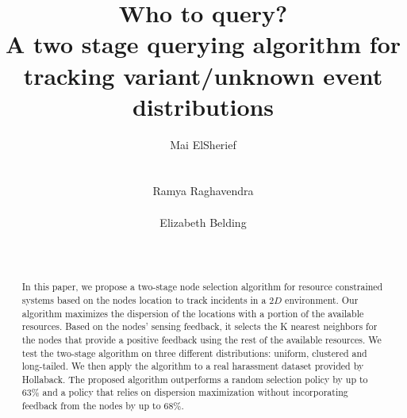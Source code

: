 \documentclass{acm_proc_article-sp}
\begin{document}
\title{Who to query? \\A two stage querying algorithm for tracking variant/unknown event distributions }
\author{
%
%
\alignauthor
Mai ElSherief\\
   \\
   \\
   \alignauthor
Ramya Raghavendra\\
   \\
\alignauthor
Elizabeth Belding\\
  \\
   \\
}
\maketitle
\begin{abstract}
In this paper, we propose a two-stage node selection algorithm for resource constrained systems based on the nodes location to track incidents in a $2D$ environment. Our algorithm maximizes the dispersion of the locations with a portion of the available resources. Based on the nodes' sensing feedback, it selects the K nearest neighbors for the nodes that provide a positive feedback using the rest of the available resources. We test the two-stage algorithm on three different distributions: uniform, clustered and long-tailed. We then apply the algorithm to a real harassment dataset provided by Hollaback. The proposed algorithm outperforms a random selection policy by up to $63\%$ and a policy that relies on dispersion maximization without incorporating feedback from the nodes by up to $68\%$.
\end{abstract}
\end{document}
